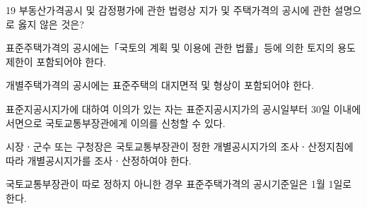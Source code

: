 \begin{question}{19}
부동산가격공시 및 감정평가에 관한 법령상 지가 및 주택가격의 공시에 관한 설명으로 옳지 않은 것은?
\begin{choices}
  \item 표준주택가격의 공시에는「국토의 계획 및 이용에 관한 법률」등에 의한 토지의 용도제한이 포함되어야 한다.
  \item 개별주택가격의 공시에는 표준주택의 대지면적 및 형상이 포함되어야 한다.
  \item 표준지공시지가에 대하여 이의가 있는 자는 표준지공시지가의 공시일부터 30일 이내에 서면으로 국토교통부장관에게 이의를 신청할 수 있다.
  \item 시장ㆍ군수 또는 구청장은 국토교통부장관이 정한 개별공시지가의 조사ㆍ산정지침에 따라 개별공시지가를 조사ㆍ산정하여야 한다.
  \item 국토교통부장관이 따로 정하지 아니한 경우 표준주택가격의 공시기준일은 1월 1일로 한다.
\end{choices}
\end{question}
